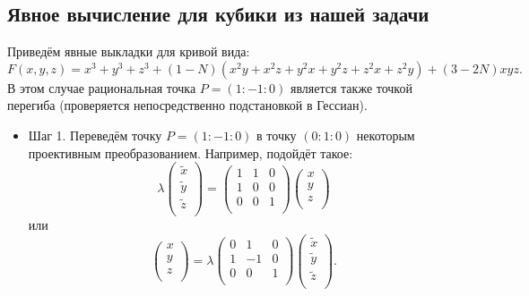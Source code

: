 \subsection*{Явное вычисление для кубики из нашей задачи}


\noindent Приведём явные выкладки для кривой вида:
\[
F(x, y, z) = x^3 + y^3 + z^3 + (1 - N) (x^2 y + x^2 z + y^2 x + y^2 z + z^2 x + z^2 y) +
(3 - 2 N) x y z 
.\] 
В этом случае рациональная точка \(P = (1 : -1 : 0)\) является также точкой перегиба
(проверяется непосредственно подстановкой в Гессиан).

\begin{itemize}[leftmargin=0.6cm]
    \item Шаг 1. Переведём точку \(P = (1 : -1 : 0)\) в точку
    \((0 : 1 : 0)\) некоторым проективным преобразованием. Например,
    подойдёт такое:
    \[
    \lambda
    \begin{pmatrix}
        \widetilde{x} \\
        \widetilde{y} \\
        \widetilde{z} \\
    \end{pmatrix} 
    = 
    \begin{pmatrix}
        1 & 1 & 0 \\
        1 & 0 & 0 \\
        0 & 0 & 1 \\
    \end{pmatrix}
    \begin{pmatrix}
        x \\
        y \\
        z \\
    \end{pmatrix}
    \]
    или
    \[
    \begin{pmatrix}
        x \\
        y \\
        z \\
    \end{pmatrix} =
    \lambda
    \begin{pmatrix}
        0 & 1 & 0 \\
        1 & -1 & 0 \\
        0 & 0 & 1 \\
    \end{pmatrix}
    \begin{pmatrix}
        \widetilde{x} \\
        \widetilde{y} \\
        \widetilde{z} \\
    \end{pmatrix} 
    .\] 
    


\end{itemize}
